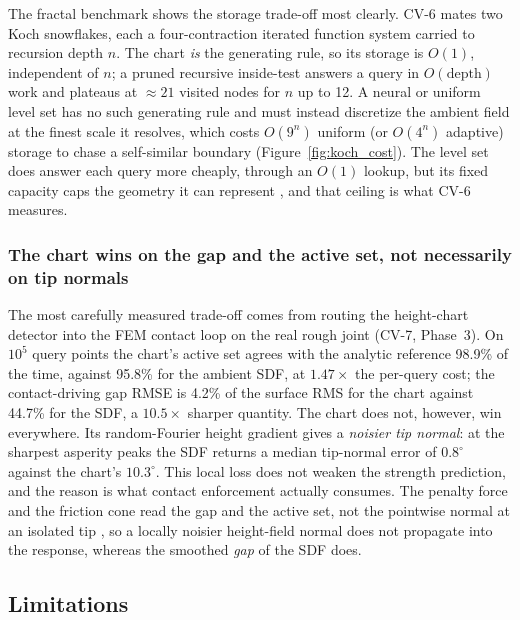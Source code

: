 The fractal benchmark shows the storage trade-off most clearly. CV-6 mates two Koch snowflakes, each a
four-contraction iterated function system carried to recursion depth $n$. The chart \emph{is} the
generating rule, so its storage is $O(1)$, independent of $n$; a pruned recursive inside-test answers a
query in $O(\text{depth})$ work and plateaus at $\approx 21$ visited nodes for $n$ up to 12. A neural or
uniform level set has no such generating rule and must instead discretize the ambient field at the
finest scale it resolves, which costs $O(9^{n})$ uniform (or $O(4^{n})$ adaptive) storage to chase a
self-similar boundary (Figure~\ref{fig:koch_cost}). The level set does answer each query more cheaply,
through an $O(1)$ lookup, but its fixed capacity caps the geometry it can represent
\citep{rahaman2019spectral,sitzmann2020implicit}, and that ceiling is what CV-6 measures.

\subsubsection{The chart wins on the gap and the active set, not necessarily on tip normals}

The most carefully measured trade-off comes from routing the height-chart detector into the FEM contact
loop on the real rough joint (CV-7, Phase~3). On $10^{5}$ query points the chart's active set agrees
with the analytic reference 98.9\% of the time, against 95.8\% for the ambient SDF, at $1.47\times$ the
per-query cost; the contact-driving gap RMSE is 4.2\% of the surface RMS for the chart against 44.7\% for
the SDF, a $10.5\times$ sharper quantity. The chart does not, however, win everywhere. Its random-Fourier
height gradient gives a \emph{noisier tip normal}: at the sharpest asperity peaks the SDF returns a
median tip-normal error of $0.8^{\circ}$ against the chart's $10.3^{\circ}$. This local loss does not
weaken the strength prediction, and the reason is what contact enforcement actually consumes. The
penalty force and the friction cone read the gap and the active set, not the pointwise normal at an
isolated tip \citep{wriggers2006computational,laursen2002computational}, so a locally noisier height-field
normal does not propagate into the response, whereas the smoothed \emph{gap} of the SDF does.

\subsection{Limitations}\label{sec:disc:limits}

